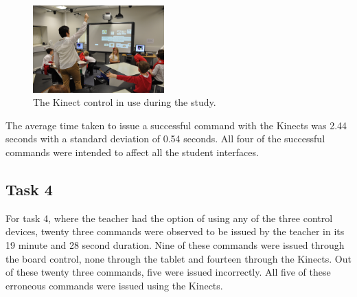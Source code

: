 \documentclass[link]{IWCOMP}
\begin{document}
\begin{figure}[h]
   \centering
   \includegraphics[width=0.45\textwidth]{figures/study_kinect.png}
   \caption{The Kinect control in use during the study.}
   \label{fig:studyKinect}
\end{figure}

The average time taken to issue a successful command with the Kinects was 2.44 seconds with a standard deviation of 0.54 seconds.
All four of the successful commands were intended to affect all the student interfaces.

\subsection{Task 4}
\label{subsec:resultsTask4}

For task 4, where the teacher had the option of using any of the three control devices, twenty three commands were observed to be issued by the teacher in its 19 minute and 28 second duration.
Nine of these commands were issued through the board control, none through the tablet and fourteen through the Kinects.
Out of these twenty three commands, five were issued incorrectly.
All five of these erroneous commands were issued using the Kinects.
\end{document}
